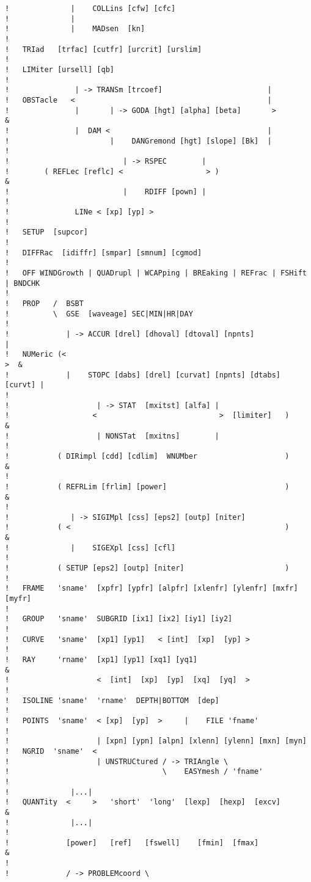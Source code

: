 \documentclass[12pt]{book}
\begin{document}
\begin{verbatim}
!              |    COLLins [cfw] [cfc]
!              |
!              |    MADsen  [kn]
!
!   TRIad   [trfac] [cutfr] [urcrit] [urslim]
!
!   LIMiter [ursell] [qb]
!
!               | -> TRANSm [trcoef]                        |
!   OBSTacle   <                                            |
!               |       | -> GODA [hgt] [alpha] [beta]       >              &
!               |  DAM <                                    |
!                       |    DANGremond [hgt] [slope] [Bk]  |
!
!                          | -> RSPEC        |
!        ( REFLec [reflc] <                   > )                           &
!                          |    RDIFF [pown] |
!
!               LINe < [xp] [yp] >
!
!   SETUP  [supcor]
!
!   DIFFRac  [idiffr] [smpar] [smnum] [cgmod]
!
!   OFF WINDGrowth | QUADrupl | WCAPping | BREaking | REFrac | FSHift | BNDCHK
!
!   PROP   /  BSBT
!          \  GSE  [waveage] SEC|MIN|HR|DAY
!
!             | -> ACCUR [drel] [dhoval] [dtoval] [npnts]               |
!   NUMeric (<                                                           >  &
!             |    STOPC [dabs] [drel] [curvat] [npnts] [dtabs] [curvt] |
!
!                    | -> STAT  [mxitst] [alfa] |
!                   <                            >  [limiter]   )           &
!                    | NONSTat  [mxitns]        |
!
!           ( DIRimpl [cdd] [cdlim]  WNUMber                    )           &
!
!           ( REFRLim [frlim] [power]                           )           &
!
!              | -> SIGIMpl [css] [eps2] [outp] [niter]
!           ( <                                                 )           &
!              |    SIGEXpl [css] [cfl]
!
!           ( SETUP [eps2] [outp] [niter]                       )
!
!   FRAME   'sname'  [xpfr] [ypfr] [alpfr] [xlenfr] [ylenfr] [mxfr] [myfr]
!
!   GROUP   'sname'  SUBGRID [ix1] [ix2] [iy1] [iy2]
!
!   CURVE   'sname'  [xp1] [yp1]   < [int]  [xp]  [yp] >
!
!   RAY     'rname'  [xp1] [yp1] [xq1] [yq1]                                &
!                    <  [int]  [xp]  [yp]  [xq]  [yq]  >
!
!   ISOLINE 'sname'  'rname'  DEPTH|BOTTOM  [dep]
!
!   POINTS  'sname'  < [xp]  [yp]  >     |    FILE 'fname'
!
!                    | [xpn] [ypn] [alpn] [xlenn] [ylenn] [mxn] [myn]
!   NGRID  'sname'  <
!                    | UNSTRUCtured / -> TRIAngle \
!                                   \    EASYmesh / 'fname'
!
!              |...|
!   QUANTity  <     >   'short'  'long'  [lexp]  [hexp]  [excv]             &
!              |...|
!
!             [power]   [ref]   [fswell]    [fmin]  [fmax]                  &
!
!             / -> PROBLEMcoord \

\end{verbatim}
\end{document}
